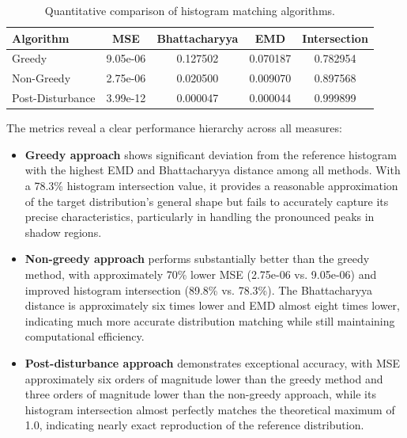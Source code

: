 \documentclass[12pt,a4paper]{article}
\begin{document}
\begin{table}[htbp]
    \centering
    \begin{tabular}{lcccc}
        \toprule
        \textbf{Algorithm} & \textbf{MSE} & \textbf{Bhattacharyya} & \textbf{EMD} & \textbf{Intersection} \\
        \midrule
        Greedy & 9.05e-06 & 0.127502 & 0.070187 & 0.782954 \\
        Non-Greedy & 2.75e-06 & 0.020500 & 0.009070 & 0.897568 \\
        Post-Disturbance & 3.99e-12 & 0.000047 & 0.000044 & 0.999899 \\
        \bottomrule
    \end{tabular}
    \caption{Quantitative comparison of histogram matching algorithms.}
    \label{tab:match_metrics}
\end{table}

The metrics reveal a clear performance hierarchy across all measures:
\begin{itemize}
    \item \textbf{Greedy approach} shows significant deviation from the reference histogram with the highest EMD and Bhattacharyya distance among all methods. With a 78.3\% histogram intersection value, it provides a reasonable approximation of the target distribution's general shape but fails to accurately capture its precise characteristics, particularly in handling the pronounced peaks in shadow regions.
    
    \item \textbf{Non-greedy approach} performs substantially better than the greedy method, with approximately 70\% lower MSE (2.75e-06 vs. 9.05e-06) and improved histogram intersection (89.8\% vs. 78.3\%). The Bhattacharyya distance is approximately six times lower and EMD almost eight times lower, indicating much more accurate distribution matching while still maintaining computational efficiency.
    
    \item \textbf{Post-disturbance approach} demonstrates exceptional accuracy, with MSE approximately six orders of magnitude lower than the greedy method and three orders of magnitude lower than the non-greedy approach, while its histogram intersection almost perfectly matches the theoretical maximum of 1.0, indicating nearly exact reproduction of the reference distribution.
\end{itemize}



\newpage
\end{document}
